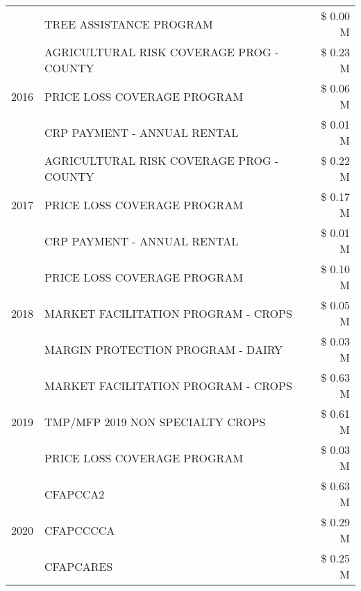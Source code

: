 \begin{tabular}{llr}
 & TREE ASSISTANCE PROGRAM & \$ 0.00 M \\
\cline{1-3}
\multirow[t]{3}{*}{2016} & AGRICULTURAL RISK COVERAGE PROG - COUNTY & \$ 0.23 M \\
 & PRICE LOSS COVERAGE PROGRAM & \$ 0.06 M \\
 & CRP PAYMENT - ANNUAL RENTAL & \$ 0.01 M \\
\cline{1-3}
\multirow[t]{3}{*}{2017} & AGRICULTURAL RISK COVERAGE PROG - COUNTY & \$ 0.22 M \\
 & PRICE LOSS COVERAGE PROGRAM & \$ 0.17 M \\
 & CRP PAYMENT - ANNUAL RENTAL & \$ 0.01 M \\
\cline{1-3}
\multirow[t]{3}{*}{2018} & PRICE LOSS COVERAGE PROGRAM & \$ 0.10 M \\
 & MARKET FACILITATION PROGRAM - CROPS & \$ 0.05 M \\
 & MARGIN PROTECTION PROGRAM - DAIRY & \$ 0.03 M \\
\cline{1-3}
\multirow[t]{3}{*}{2019} & MARKET FACILITATION PROGRAM - CROPS & \$ 0.63 M \\
 & TMP/MFP 2019 NON SPECIALTY CROPS & \$ 0.61 M \\
 & PRICE LOSS COVERAGE PROGRAM & \$ 0.03 M \\
\cline{1-3}
\multirow[t]{3}{*}{2020} & CFAPCCA2 & \$ 0.63 M \\
 & CFAPCCCCA & \$ 0.29 M \\
 & CFAPCARES & \$ 0.25 M \\
\cline{1-3}
\bottomrule
\end{tabular}
